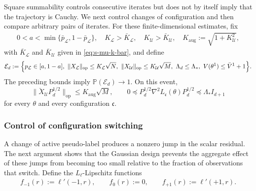 Square summability controls consecutive iterates but does not
by itself imply that the trajectory is Cauchy. We next control
changes of configuration and then compare arbitrary pairs of
iterates. For these finite-dimensional estimates, fix
\begin{align}
    0<a<\min\{\bar p_{\mathcal L},1-\bar p_{\mathcal L}\},
    \quad K_{\mathcal L}>\bar K_{\mathcal L}
    , \quad K_{\mathcal U}>\bar K_{\mathcal U},
    \quad K_{\mathrm{aug}}:=\sqrt{1+K_{\mathcal U}^2}, \label{eq:a-k-k-aug}
\end{align}
with $\bar K_{\mathcal{L}}$ and $\bar K_{\mathcal U}$ given in \eqref{eq:s-mu-k-bar},
and define
\begin{equation}
\begin{split}
    \mathcal E_d:=\Bigl\{
        p_{\mathcal L}\in[a,1-a],\
        \|X_{\mathcal L}\|_{\mathrm{op}}\leq K_{\mathcal L}\sqrt N, \
        \|X_{\mathcal U}\|_{\mathrm{op}}\leq K_{\mathcal U}\sqrt M,\
        \Lambda_d\leq\Lambda_*,\
        V(\theta^1)\leq\bar V^1+1
    \Bigr\}.
\end{split}
    \label{eq:long-time-good-event}
\end{equation}
The preceding bounds imply $\mathbb P(\mathcal E_d)\to1$.
On this event,
\begin{equation}
    \|\breve X_{\mathcal U}P_d^{1/2}\|_{\mathrm{op}}
    \leq K_{\mathrm{aug}}\sqrt M,
    \qquad
    0\preceq P_d^{1/2}\nabla^2L_{\mathfrak c}(\theta)P_d^{1/2}
       \preceq\Lambda_*I_{d+1}
    \label{eq:long-time-uniform-upper-bounds}
\end{equation}
for every $\theta$ and every configuration $\mathfrak c$.

\subsubsection{Control of configuration switching}
\label{subsubsec:mean-field-configuration-switching}

A change of active pseudo-label produces a nonzero jump in the
scalar residual. The next argument shows that the Gaussian design
prevents the aggregate effect of these jumps from becoming too
small relative to the fraction of observations that switch.
Define the $L_\ell$-Lipschitz functions
\begin{align}
    f_{-1}(r):=\ell'(-1,r),\qquad f_0(r):=0,\qquad
    f_{+1}(r):=\ell'(+1,r). \label{eq:def-f}
\end{align}

